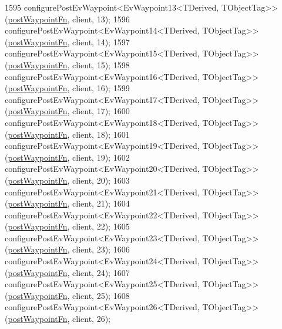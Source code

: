 \begin{DoxyCode}
1595     configurePostEvWaypoint<EvWaypoint13<TDerived, TObjectTag>>(\hyperlink{classmove__base__z__client_1_1WaypointEventDispatcher_acc538eb7506c13f7cca2268a1742dadd}{postWaypointFn}, client, 13);
1596     configurePostEvWaypoint<EvWaypoint14<TDerived, TObjectTag>>(\hyperlink{classmove__base__z__client_1_1WaypointEventDispatcher_acc538eb7506c13f7cca2268a1742dadd}{postWaypointFn}, client, 14);
1597     configurePostEvWaypoint<EvWaypoint15<TDerived, TObjectTag>>(\hyperlink{classmove__base__z__client_1_1WaypointEventDispatcher_acc538eb7506c13f7cca2268a1742dadd}{postWaypointFn}, client, 15);
1598     configurePostEvWaypoint<EvWaypoint16<TDerived, TObjectTag>>(\hyperlink{classmove__base__z__client_1_1WaypointEventDispatcher_acc538eb7506c13f7cca2268a1742dadd}{postWaypointFn}, client, 16);
1599     configurePostEvWaypoint<EvWaypoint17<TDerived, TObjectTag>>(\hyperlink{classmove__base__z__client_1_1WaypointEventDispatcher_acc538eb7506c13f7cca2268a1742dadd}{postWaypointFn}, client, 17);
1600     configurePostEvWaypoint<EvWaypoint18<TDerived, TObjectTag>>(\hyperlink{classmove__base__z__client_1_1WaypointEventDispatcher_acc538eb7506c13f7cca2268a1742dadd}{postWaypointFn}, client, 18);
1601     configurePostEvWaypoint<EvWaypoint19<TDerived, TObjectTag>>(\hyperlink{classmove__base__z__client_1_1WaypointEventDispatcher_acc538eb7506c13f7cca2268a1742dadd}{postWaypointFn}, client, 19);
1602     configurePostEvWaypoint<EvWaypoint20<TDerived, TObjectTag>>(\hyperlink{classmove__base__z__client_1_1WaypointEventDispatcher_acc538eb7506c13f7cca2268a1742dadd}{postWaypointFn}, client, 20);
1603     configurePostEvWaypoint<EvWaypoint21<TDerived, TObjectTag>>(\hyperlink{classmove__base__z__client_1_1WaypointEventDispatcher_acc538eb7506c13f7cca2268a1742dadd}{postWaypointFn}, client, 21);
1604     configurePostEvWaypoint<EvWaypoint22<TDerived, TObjectTag>>(\hyperlink{classmove__base__z__client_1_1WaypointEventDispatcher_acc538eb7506c13f7cca2268a1742dadd}{postWaypointFn}, client, 22);
1605     configurePostEvWaypoint<EvWaypoint23<TDerived, TObjectTag>>(\hyperlink{classmove__base__z__client_1_1WaypointEventDispatcher_acc538eb7506c13f7cca2268a1742dadd}{postWaypointFn}, client, 23);
1606     configurePostEvWaypoint<EvWaypoint24<TDerived, TObjectTag>>(\hyperlink{classmove__base__z__client_1_1WaypointEventDispatcher_acc538eb7506c13f7cca2268a1742dadd}{postWaypointFn}, client, 24);
1607     configurePostEvWaypoint<EvWaypoint25<TDerived, TObjectTag>>(\hyperlink{classmove__base__z__client_1_1WaypointEventDispatcher_acc538eb7506c13f7cca2268a1742dadd}{postWaypointFn}, client, 25);
1608     configurePostEvWaypoint<EvWaypoint26<TDerived, TObjectTag>>(\hyperlink{classmove__base__z__client_1_1WaypointEventDispatcher_acc538eb7506c13f7cca2268a1742dadd}{postWaypointFn}, client, 26);

\end{DoxyCode}

